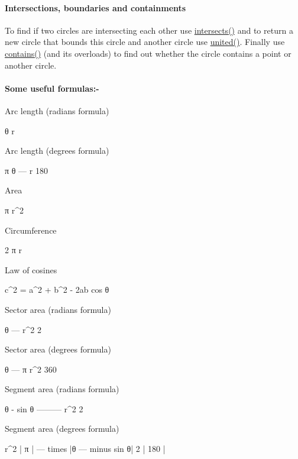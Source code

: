 \paragraph*{Intersections, boundaries and containments}

To find if two circles are intersecting each other use \hyperlink{classprism_1_1geometry_1_1_circle_ac1b7633b8c79512d73fa8a9615d85e9f}{intersects()} and to return a new circle that bounds this circle and another circle use \hyperlink{classprism_1_1geometry_1_1_circle_ae7a4b0fb426bc2ab657f12f4e5e2321c}{united()}. Finally use \hyperlink{classprism_1_1geometry_1_1_circle_aa736377f605a821966da046a33146fc8}{contains()} (and its overloads) to find out whether the circle contains a point or another circle.

\paragraph*{Some useful formulas\+:-\/}

Arc length (radians formula) 
\begin{DoxyCode}
θ r
\end{DoxyCode}


Arc length (degrees formula) 
\begin{DoxyCode}
   π
θ --- r
  180
\end{DoxyCode}


Area 
\begin{DoxyCode}
π r^2
\end{DoxyCode}


Circumference 
\begin{DoxyCode}
2 π r
\end{DoxyCode}


Law of cosines 
\begin{DoxyCode}
c^2 = a^2 + b^2 - 2ab cos θ
\end{DoxyCode}


Sector area (radians formula) 
\begin{DoxyCode}
 θ
--- r^2
 2
\end{DoxyCode}


Sector area (degrees formula) 
\begin{DoxyCode}
 θ
--- π r^2
360
\end{DoxyCode}


Segment area (radians formula) 
\begin{DoxyCode}
θ - sin θ
--------- r^2
    2
\end{DoxyCode}


Segment area (degrees formula) 
\begin{DoxyCode}
r^2       |   π              |
--- times |θ ---  minus sin θ|
 2        |  180             |
\end{DoxyCode}
 

